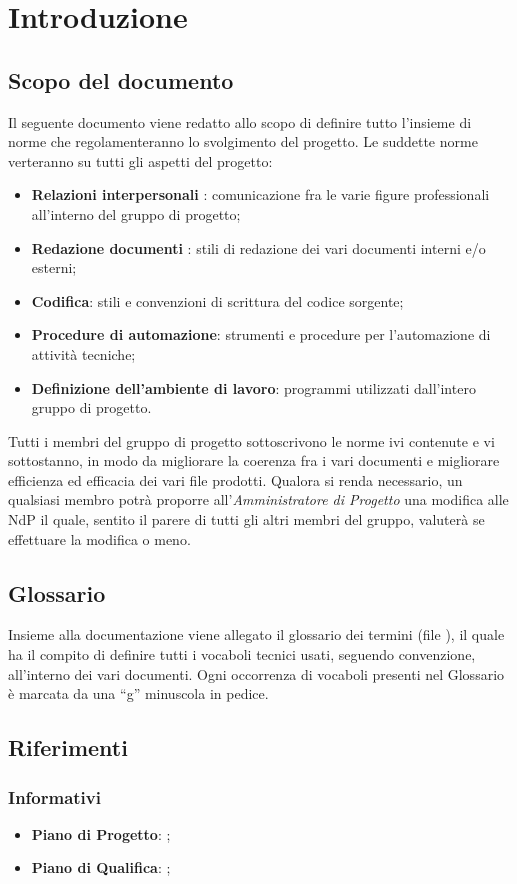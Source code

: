 \section{Introduzione}{
	\subsection{Scopo del documento}{
		Il seguente documento viene redatto allo scopo di definire tutto l’insieme di norme che regolamenteranno lo svolgimento del progetto. Le suddette norme verteranno su tutti gli aspetti del progetto:
		\begin{itemize}
        \item \textbf{Relazioni interpersonali} : comunicazione fra le varie figure professionali
		all’interno del gruppo di progetto;
		\item \textbf{Redazione documenti} : stili di redazione dei vari documenti interni e/o
		esterni;
		\item \textbf{Codifica}: stili e convenzioni di scrittura del codice sorgente;
		\item \textbf{Procedure di automazione}: strumenti e procedure per l’automazione
		di attività tecniche;
		\item \textbf{Definizione dell’ambiente di lavoro}: programmi utilizzati dall’intero
		gruppo di progetto.
		\end{itemize}
		Tutti i membri del gruppo di progetto sottoscrivono le norme ivi contenute e vi	sottostanno, in modo da migliorare la coerenza fra i vari documenti e migliorare efficienza ed efficacia dei vari file prodotti.
		Qualora si renda necessario, un qualsiasi membro potrà proporre all’\emph{Amministratore di Progetto} una modifica alle NdP il quale, sentito il parere di tutti gli altri membri del gruppo, valuterà se effettuare la modifica o meno.
		
	 }
	\subsection{Glossario}{ 
	Insieme alla documentazione viene allegato il glossario dei termini (file \href{run:../../Esterni/\fGlossario}{\fEscapeGlossario}), il quale ha il compito di definire tutti i vocaboli tecnici usati, seguendo convenzione, all’interno dei vari documenti.  Ogni occorrenza di vocaboli presenti nel Glossario è marcata da una “g” minuscola in pedice.	
	}
}
   \subsection{Riferimenti}
     \subsubsection{Informativi}
     \begin{itemize}
       \item \textbf{Piano di Progetto}: \href{run:../../Interni/\fPianoDiProgetto}{\fEscapePianoDiProgetto};
       \item \textbf{Piano di Qualifica}:  \href{run:../../Interni/\fPianoDiQualifica}{\fEscapePianoDiQualifica};
     \end{itemize}
        